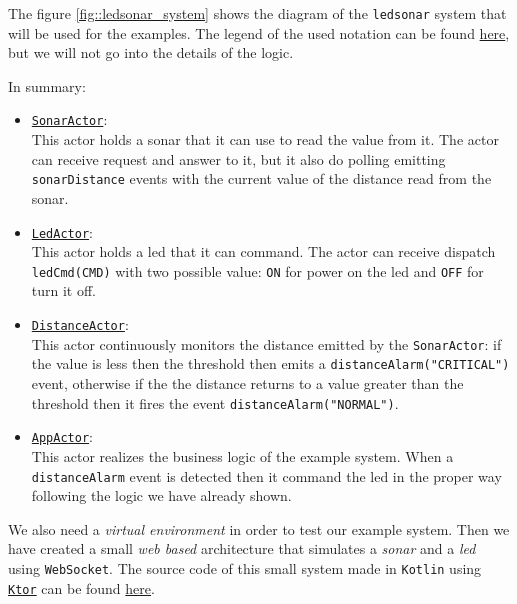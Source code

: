 The figure \ref{fig::ledsonar_system} shows the diagram of the \texttt{ledsonar} system that will be used for the examples. The legend of the used notation can be found \href{https://github.com/anatali/issLab2021/blob/main/it.unibo.issLabStart/userDocs/Legenda.pptx}{here}, 
but we will not go into the details of the logic.

In summary:
\begin{itemize}
	\item \underline{\texttt{SonarActor}}:\\
	This actor holds a sonar that it can use to read the value from it.
	The actor can receive request and answer to it, but it also do polling emitting \texttt{sonarDistance} events with the current value of the distance read from the sonar.
	
	\item \underline{\texttt{LedActor}}:\\
	This actor holds a led that it can command.
	The actor can receive dispatch \texttt{ledCmd(CMD)} with two possible value: \texttt{ON} for power on the led and \texttt{OFF} for turn it off.
	
	\item \underline{\texttt{DistanceActor}}:\\
	This actor continuously monitors the distance emitted by the \texttt{SonarActor}: if the value is less then the threshold then emits a \texttt{distanceAlarm("CRITICAL")} event, otherwise if the the distance returns to a value greater than the threshold then it fires the event \texttt{distanceAlarm("NORMAL")}.
	
	\item \underline{\texttt{AppActor}}:\\
	This actor realizes the business logic of the example system. When a \texttt{distanceAlarm} event is detected then it command the led in the proper way following the logic we have already shown.
\end{itemize}

We also need a \textit{virtual environment} in order to test our example system. Then we have created a small \textit{web based} architecture that simulates a \textit{sonar} and a \textit{led} using \texttt{WebSocket}.
The source code of this small system made in \texttt{Kotlin} using \href{https://ktor.io/}{\texttt{Ktor}} can be found \href{https://github.com/LM-96/QA-Extensions/tree/main/it.unibo.ledsonarsystem}{here}.

